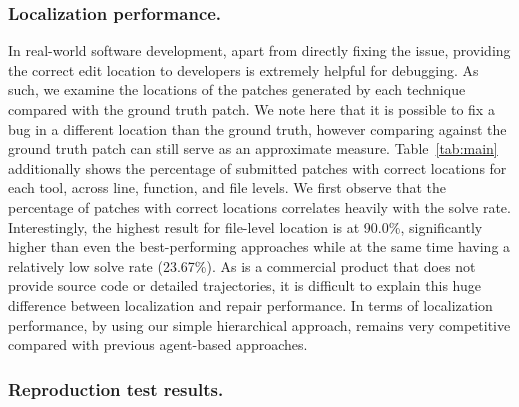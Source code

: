 \subsubsection{Localization performance.} In real-world software development, apart from directly fixing the issue, providing the correct edit location to developers is extremely helpful for debugging. 
As such, we examine the locations of the patches generated by each technique compared with the ground truth patch. 
We note here that it is possible to fix a bug in a different location than the ground truth, however comparing against the ground truth patch can still serve as an approximate measure.  
Table~\ref{tab:main} additionally shows the {percentage} of {submitted patches with correct locations} for each tool{, across} line, function, and file levels.
We first observe that the percentage of {patches with correct locations} correlates heavily with the solve rate. 
Interestingly, the highest result for file-level location is \opencsgagent{} at 90.0\%, significantly higher than even the best-performing approaches while at the same time having a relatively low solve rate (23.67\%). 
As \opencsgagent{} is a commercial product that does not provide source code or detailed trajectories, it is difficult to explain this huge difference between localization and repair performance. 
In terms of localization performance, by using our simple hierarchical approach, \tech remains very competitive compared with previous agent-based approaches.

\subsubsection{Reproduction test results.}

